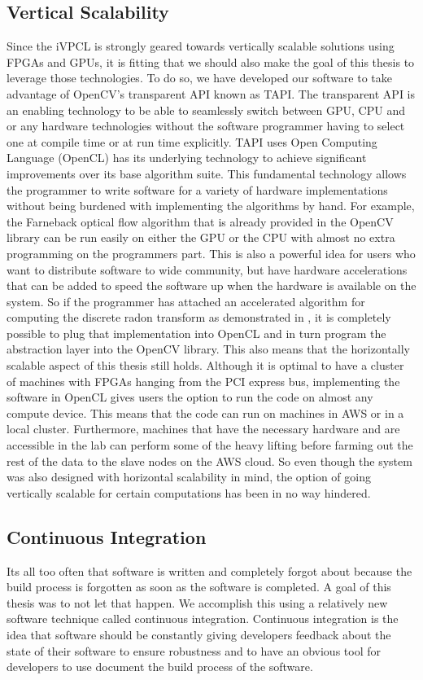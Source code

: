 \subsection{\label{subsection:opencv_tapi}Vertical Scalability}
Since the iVPCL is strongly geared towards vertically scalable solutions using
FPGAs and GPUs, it is fitting that we should also make the goal of this thesis
to leverage those technologies. To do so, we have developed our software to take
advantage of OpenCV's transparent API known as TAPI. The transparent API is an
enabling technology to be able to seamlessly switch between GPU, CPU and or any
hardware technologies without the software programmer having to select one at
compile time or at run time explicitly. TAPI uses Open Computing Language
(OpenCL) has its underlying technology to achieve significant improvements over
its base algorithm suite. This fundamental technology allows the programmer to
write software for a variety of hardware implementations without being burdened
with implementing the algorithms by hand. For example, the Farneback optical
flow algorithm that is already provided in the OpenCV library can be run easily
on either the GPU or the CPU with almost no extra programming on the programmers
part. This is also a powerful idea for users who want to distribute software to
wide community, but have hardware accelerations that can be added to speed the
software up when the hardware is available on the system. So if the programmer
has attached an accelerated algorithm for computing the discrete radon transform
as demonstrated in \cite{Cesar2014a}, it is completely possible to plug that
implementation into OpenCL and in turn program the abstraction layer into the OpenCV
library. This also means that the horizontally scalable aspect of this thesis
still holds. Although it is optimal to have a cluster of machines with FPGAs
hanging from the PCI express bus, implementing the software in OpenCL gives
users the option to run the code on almost any compute device. This means that
the code can run on machines in AWS or in a local cluster. Furthermore, machines
that have the necessary hardware and are accessible in the lab can perform some
of the heavy lifting before farming out the rest of the data to the slave nodes
on the AWS cloud. So even though the system was also designed with horizontal
scalability in mind, the option of going vertically scalable for certain computations
has been in no way hindered.

\subsection{\label{subsection:cont_integration}Continuous Integration}
Its all too often that software is written and completely forgot about because
the build process is forgotten as soon as the software is completed. A goal
of this thesis was to not let that happen. We accomplish this using a relatively
new software technique called continuous integration. Continuous integration
is the idea that software should be constantly giving developers feedback
about the state of their software to ensure robustness and to have an obvious
tool for developers to use document the build process of the software.

